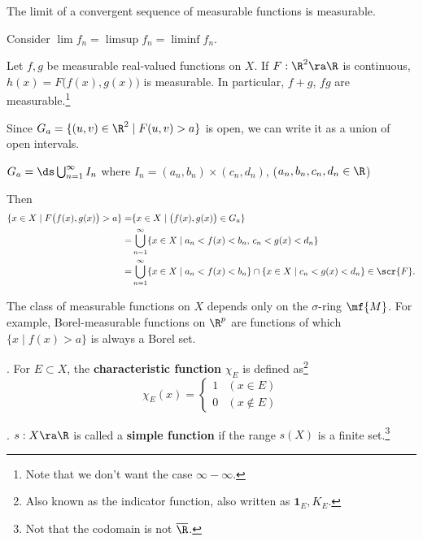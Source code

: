 \cor The limit of a convergent sequence of measurable functions is measurable.

\pf Consider \(\lim f_n = \limsup f_n = \liminf f_n\).

\pagebreak

 Let \(f, g\) be measurable real-valued functions on \(X\). If \(F: \R^2 \ra \R\) is continuous, \(h(x) = F\big(f(x), g(x)\big)\) is measurable. In particular, \(f + g\), \(fg\) are measurable.\footnote{Note that we don't want the case \(\infty - \infty\).}

\pf Since \(G_a = \{(u, v)\in \R^2 \mid F(u, v) > a\}\) is open, we can write it as a union of open intervals.
\begin{center}
    \(G_a = \ds \bigcup_{n=1}^{\infty} I_n\) where \(I_n = (a_n, b_n) \times (c_n, d_n)\), \quad (\(a_n, b_n, c_n, d_n\in \R\))
\end{center}
Then
\[
    \begin{aligned}
        \{x \in X \mid F\bigl(f(x), g(x)\bigr) > a\} = & \{x \in X \mid \bigl(f(x), g(x)\bigr) \in G_a\}                                                              \\
        =                                              & \bigcup_{n=1}^{\infty} \{x \in X \mid a_n < f(x) < b_n,\, c_n < g(x) < d_n\}                                 \\
        =                                              & \bigcup_{n=1}^{\infty} \{x \in X \mid a_n < f(x) < b_n\} \cap \{x \in X \mid c_n < g(x) < d_n\} \in \scr{F}.
    \end{aligned}
\]

The class of measurable functions on \(X\) depends only on the \(\sigma\)-ring \(\mf{M}\). For example, Borel-measurable functions on \(\R^p\) are functions of which \(\{x \mid f(x) > a\}\) is always a Borel set.

.  For \(E \subset X\), the \textbf{characteristic function} \(\chi_E\) is defined as\footnote{Also known as the indicator function, also written as \(\mathbf{1}_E, K_E\).}\\
\[
    \chi_E(x) = \begin{cases}
        1 & (x\in E) \\ 0 & (x \notin E)
    \end{cases}
\]

.  \(s: X\ra\R\) is called a \textbf{simple function} if the range \(s(X)\) is a finite set.\footnote{Not that the codomain is not \(\overline{\R}\).}


